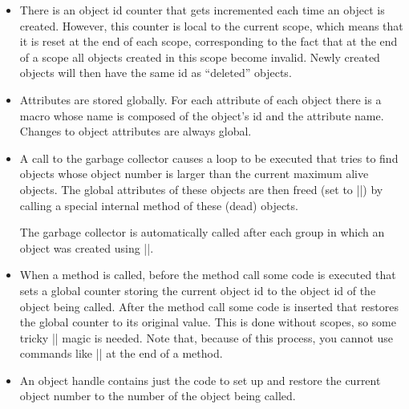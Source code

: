 \begin{itemize}
\item There is an object id counter that gets incremented each time an
  object is created. However, this counter is local to the current
  scope, which means that it is reset at the end of each scope,
  corresponding to the fact that at the end of a scope all objects
  created in this scope become invalid. Newly created objects will
  then have the same id as ``deleted'' objects.
\item Attributes are stored globally. For each attribute of each
  object there is a macro whose name is composed of the object's id
  and the attribute name. Changes to object attributes are always
  global.
\item A call to the garbage collector causes a loop to be executed
  that tries to find objects whose object number is larger than the
  current maximum alive objects. The global attributes of these
  objects are then freed (set to |\relax|) by calling a special
  internal method of these (dead) objects.

  The garbage collector is automatically called after each group in
  which an object was created using |\aftergroup|.
\item When a method is called, before the method call some code is
  executed that sets a global counter storing the current object id to
  the object id of the object being called. After the method call some
  code is inserted that restores the global counter to its original
  value. This is done without scopes, so some tricky |\expandafter|
  magic is needed. Note that, because of this process, you cannot use
  commands like |\pgfutil@ifnextchar| at the end of a method.
\item An object handle contains just the code to set up and restore the
  current object number to the number of the object being called.
\end{itemize}
